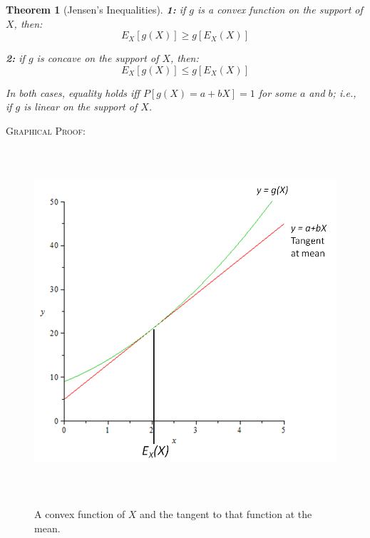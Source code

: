 \documentclass[12pt,a4paper]{article}
\newtheorem{thm}{Theorem}[subsection]
\begin{document}
\begin{thm}[Jensen's Inequalities]\vspace{1cm}

\textbf{1: } if $g$ is a convex function on the support of $X$, then:
$$E_X[g(X)] \geq g[E_X(X)]$$\par\vspace{1cm}

\textbf{2: } if $g$ is concave on the support of $X$, then:
$$E_X[g(X)] \leq g[E_X(X)]$$\par\vspace{1cm}

In both cases, equality holds iff $P[g(X) = a+bX] = 1$ for some $a$ and $b$; i.e., if $g$ is linear on the support of $X$.

\end{thm}

\noindent\textsc{Graphical Proof:}\par\vspace{1cm}

\begin{figure}[h]
\begin{center}
\includegraphics[height=12.86cm,width=13.8cm]{M2S1 Jensen's Inequalities.png}\label{jensen}
\caption{A convex function of $X$ and the tangent to that function at the mean.}
\end{center}
\end{figure}
\end{document}
